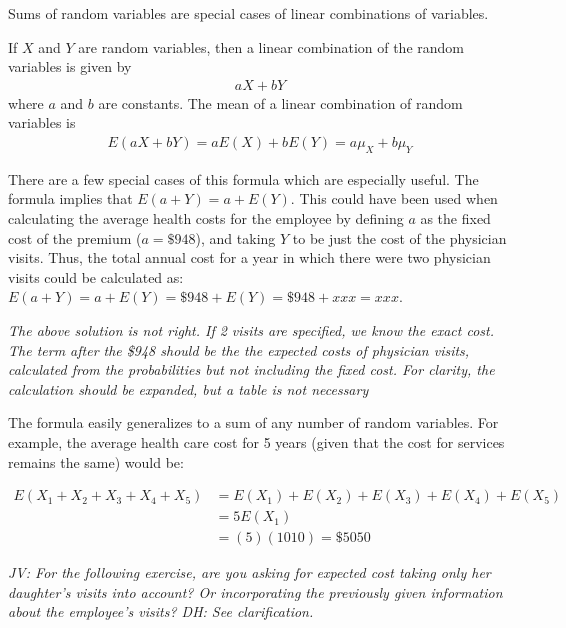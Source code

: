 Sums of random variables are special cases of linear combinations of variables.  

\begin{termBox}{
If $X$ and $Y$ are random variables, then a linear combination of the random variables is given by
\begin{align}\label{linComboOfRandomVariablesXAndY}
aX + bY
\end{align}
where $a$ and $b$ are constants.  The mean of a linear combination of random variables is 
\begin{align*}
 E(aX + bY) = aE(X) + bE(Y) = a\mu_X + b\mu_Y
\end{align*}}
\end{termBox}

There are a few special cases of this formula which are especially useful. The formula implies that $E(a + Y) = a + E(Y)$.  This could have been used when calculating the average health costs for the employee by defining $a$ as the fixed cost of the premium ($a=\$948$), and taking $Y$ to be just the cost of the physician visits. Thus, the total annual cost for a year in which there were two physician visits could be calculated as: $E(a + Y) = a + E(Y) = \$948 + E(Y) = \$948 + xxx = xxx$. 

\textit{The above solution is not right.  If 2 visits are specified, we know the exact cost. The term after the \$948 should be the the expected costs of physician visits, calculated from the probabilities but not including the fixed cost. For clarity, the calculation should be expanded, but a table is not necessary}

The formula easily generalizes to a sum of any number of random variables. For example, the average health care cost for 5 years (given that the cost for services remains the same) would be: 

\begin{align*}
	E(X_1 + X_2 + X_3 + X_4 + X_5) &= E(X_1) + E(X_2) + E(X_3) + E(X_4) + E(X_5) \\
	         &= 5E(X_1) \\
			 &=(5)(1010) = \$5050
\end{align*}

\textit{JV: For the following exercise, are you asking for expected cost taking only her daughter's visits into account? Or incorporating the previously given information about the employee's visits?  DH: See clarification.}

